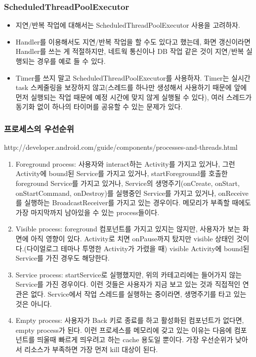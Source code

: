 \documentclass{beamer}
\newcommand\Fontvi{\fontsize{8}{9.6}\selectfont}
\begin{document}
\begin{frame}
\frametitle{ScheduledThreadPoolExecutor}
\begin{itemize}
\item 지연/반복 작업에 대해서는 ScheduledThreadPoolExecutor 사용을 고려하자.
\item Handler를 이용해서도 지연/반복 작업을 할 수도 있다고 했는데, 화면 갱신이라면 Handler를 쓰는 게 적절하지만, 네트웍 통신이나 DB 작업 같은 것이 지연/반복 실행되는 경우를 예로 들 수 있다.
\item Timer를 쓰지 말고 ScheduledThreadPoolExecutor를 사용하자. Timer는 실시간 task 스케줄링을 보장하지 않고(스레드를 하나만 생성해서 사용하기 때문에 앞에 먼저 실행되는 작업 때문에 예정 시간에 맞지 않게 실행될 수 있다), 여러 스레드가 동기화 없이 하나의 타이머를 공유할 수 있는 문제가 있다.
\end{itemize}
\end{frame}

\begin{frame}
\frametitle{프로세스의 우선순위}
\Fontvi
http://developer.android.com/guide/components/processes-and-threads.html
\begin{enumerate}
\item Foreground process: 사용자와 interact하는 Activity를 가지고 있거나, 그런 Activity에 bound된 Service를 가지고 있거나, startForeground를 호출한 foreground Service를 가지고 있거나, Service의 생명주기(onCreate, onStart, onStartCommand, onDestroy)를 실행중인 Service를 가지고 있거나, onReceive를 실행하는 BroadcastReceiver를 가지고 있는 경우이다.
메모리가 부족할 때에도 가장 마지막까지 남아있을 수 있는 process들이다.
\item Visible process: foreground 컴포넌트를 가지고 있지는 않지만, 사용자가 보는 화면에 아직 영향이 있다. Activity로 치면 onPause까지 탔지만 visible 상태인 것이다.(다이얼로그 테마나 투명한 Activity가 가렸을 때)
visible Activity에 bound된 Service를 가진 경우도 해당한다. 
\item Service process: startService로 실행했지만, 위의 카테고리에는 들어가지 않는 Service를 가진 경우이다. 이런 것들은 사용자가 지금 보고 있는 것과 직접적인 연관은 없다. Service에서 작업 스레드를 실행하는 중이라면, 생명주기를 타고 있는 것은 아니다.
\item Empty process: 사용자가 Back 키로 종료를 하고 활성화된 컴포넌트가 없다면,  empty process가 된다. 이런 프로세스를 메모리에 갖고 있는 이유는 다음에 컴포넌트를 띄울때 빠르게 띄우려고 하는 cache 용도일 뿐이다. 가장 우선순위가 낮아서 리소스가 부족하면 가장 먼저 kill 대상이 된다.
\end{enumerate}
\end{frame}
\end{document}
